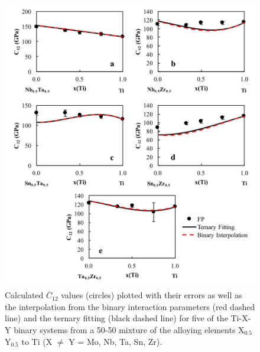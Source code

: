 \pagebreak
\begin{figure}[H]
	\centering
	\includegraphics[width=\textwidth]{Chapter-6/Figures/tixyc122.png}
	\caption{Calculated $\overline{C}_{12}$ values (circles) plotted with their errors as well as the interpolation from the binary interaction parameters (red dashed line) and the ternary fitting (black dashed line) for five of the Ti-X-Y binary systems from a 50-50 mixture of the alloying elements X$_{0.5}$Y$_{0.5}$ to Ti (X $\neq$ Y = Mo, Nb, Ta, Sn, Zr).}
	\label{Ch6-figure:tixyc12_2}
\end{figure}

